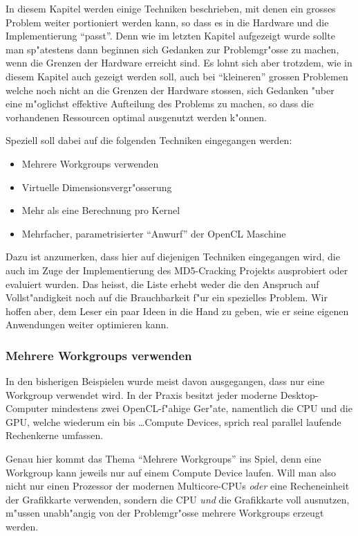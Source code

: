 \begin{refsection}
In diesem Kapitel werden einige Techniken beschrieben, mit denen ein 
grosses Problem weiter portioniert werden kann, so dass es in die 
Hardware und die Implementierung ``passt''. 
Denn wie im letzten Kapitel aufgezeigt wurde sollte man sp"atestens dann
beginnen sich Gedanken zur Problemgr"osse zu machen, wenn die 
Grenzen der Hardware erreicht sind. Es lohnt sich aber trotzdem, wie in diesem 
Kapitel auch gezeigt werden soll, auch bei ``kleineren'' grossen Problemen
welche noch nicht an die Grenzen der Hardware stossen, sich Gedanken
"uber eine m"oglichst effektive Aufteilung des Problems zu machen, so
dass die vorhandenen Ressourcen optimal  ausgenutzt werden k"onnen.

Speziell soll dabei auf die folgenden Techniken eingegangen werden:

\begin{itemize}
 \item Mehrere Workgroups verwenden
 \item Virtuelle Dimensionsvergr"osserung
 \item Mehr als eine Berechnung pro Kernel
 \item Mehrfacher, parametrisierter ``Anwurf'' der OpenCL Maschine
\end{itemize}

Dazu ist anzumerken, dass hier auf diejenigen Techniken eingegangen
wird, die auch im Zuge der Implementierung des MD5-Cracking Projekts
ausprobiert oder evaluiert wurden. Das heisst, die Liste erhebt weder
die den Anspruch auf Vollst"andigkeit noch auf die Brauchbarkeit f"ur
ein spezielles Problem. Wir hoffen aber, dem Leser ein paar Ideen
in die Hand zu geben, wie er seine eigenen Anwendungen weiter optimieren 
kann.


\subsubsection{Mehrere Workgroups verwenden}

In den bisherigen Beispielen wurde meist davon ausgegangen,
dass nur eine Workgroup verwendet wird. In der Praxis besitzt jeder
moderne Desktop-Computer mindestens zwei OpenCL-f"ahige Ger"ate, 
namentlich die CPU und die GPU, welche wiederum ein bis \ldots Compute
Devices, sprich real parallel laufende Rechenkerne umfassen.

Genau hier kommt das Thema ``Mehrere Workgroups'' ins Spiel, denn
eine Workgroup kann jeweils nur auf einem Compute Device laufen. Will man also
nicht nur einen Prozessor der modernen Multicore-CPUs \textit{oder}
eine Recheneinheit der Grafikkarte verwenden, sondern die CPU \textit{und} 
die Grafikkarte voll ausnutzen, m"ussen unabh"angig
von der Problemgr"osse mehrere Workgroups erzeugt werden.


\end{refsection}

